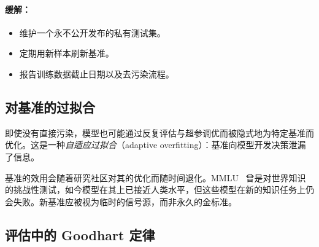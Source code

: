 \paragraph{缓解：}
\label{mitigation}

\begin{itemize}
  \item 维护一个永不公开发布的私有测试集。
  \item 定期用新样本刷新基准。
  \item 报告训练数据截止日期以及去污染流程。
\end{itemize}

\subsection{对基准的过拟合}
\label{overfitting-to-benchmarks}

即使没有直接污染，模型也可能通过反复评估与超参调优而被隐式地为特定基准而优化。这是一种\emph{自适应过拟合}（adaptive overfitting）：基准向模型开发决策泄漏了信息。

\begin{warningbox}[基准的生命周期]
基准的效用会随着研究社区对其的优化而随时间退化。MMLU~\cite{hendrycks2021measuring} 曾是对世界知识的挑战性测试，如今模型在其上已接近人类水平，但这些模型在新的知识任务上仍会失败。新基准应被视为临时的信号源，而非永久的金标准。
\end{warningbox}

\subsection{评估中的 Goodhart 定律}
\label{goodharts-law-in-evaluation}

